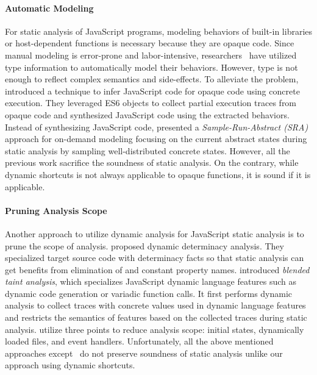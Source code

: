 \paragraph{Automatic Modeling}
For static analysis of JavaScript programs, modeling behaviors of built-in
libraries or host-dependent functions is necessary because they are opaque code.
Since manual modeling is error-prone and labor-intensive,
researchers~\cite{safewapi, safets} have utilized type information to
automatically model their behaviors.  However, type is not enough
to reflect complex semantics and side-effects.
To alleviate the problem, \citet{mimic} introduced a technique
to infer JavaScript code for opaque code using concrete execution.
They leveraged ES6  objects to collect partial execution traces
from opaque code and synthesized JavaScript code using the extracted behaviors.
Instead of synthesizing JavaScript code,
\citet{opaque-model} presented a \textit{Sample-Run-Abstract (SRA)} approach for
on-demand modeling focusing on the current abstract states during static analysis
by sampling well-distributed concrete states.
However, all the previous work sacrifice the soundness of static analysis.
On the contrary, while dynamic shortcuts is not always applicable to opaque
functions, it is sound if it is applicable.


\paragraph{Pruning Analysis Scope}
Another approach to utilize dynamic analysis for JavaScript static analysis is
to prune the scope of analysis.  \citet{determinacy} proposed dynamic
determinacy analysis.  They specialized target source code with determinacy
facts so that static analysis can get benefits from elimination of 
and constant property names.
\citet{blended} introduced \textit{blended taint analysis}, which specializes JavaScript dynamic
language features such as dynamic code generation or variadic function calls.
It first performs dynamic analysis to collect traces with concrete values used
in dynamic language features and restricts the semantics of features based on the
collected traces during static analysis.  \citet{battles, eha} utilize three points to reduce
analysis scope: initial states, dynamically loaded files, and event handlers.
Unfortunately, all the above mentioned approaches except~\cite{determinacy} do not preserve
soundness of static analysis unlike our approach using dynamic shortcuts.


